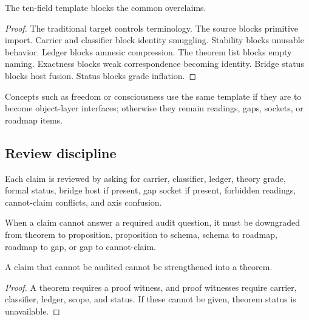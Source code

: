 \begin{theorem}
\label{thm:philosophy-template-prevents-overclaiming}
The ten-field template blocks the common overclaims.
\end{theorem}
\begin{proof}
The traditional target controls terminology. The source blocks
primitive import. Carrier and classifier block identity smuggling.
Stability blocks unusable behavior. Ledger blocks amnesic compression.
The theorem list blocks empty naming. Exactness blocks weak
correspondence becoming identity. Bridge status blocks host fusion.
Status blocks grade inflation.
\end{proof}

\begin{corollary}
\label{cor:philosophy-objects-use-template}
Concepts such as freedom or consciousness use the same template if
they are to become object-layer interfaces; otherwise they remain
readings, gaps, sockets, or roadmap items.
\end{corollary}

\subsection{Review discipline}
\label{subsec:philosophy-review-discipline}

\begin{definition}
\label{def:philosophy-review-questions}
Each claim is reviewed by asking for carrier, classifier, ledger,
theory grade, formal status, bridge host if present, gap socket if
present, forbidden readings, cannot-claim conflicts, and axis
confusion.
\end{definition}

\begin{definition}
\label{def:philosophy-automatic-downgrade}
When a claim cannot answer a required audit question, it must be
downgraded from theorem to proposition, proposition to schema, schema
to roadmap, roadmap to gap, or gap to cannot-claim.
\end{definition}

\begin{theorem}
\label{thm:philosophy-unauditable-claims-not-strengthened}
A claim that cannot be audited cannot be strengthened into a theorem.
\end{theorem}
\begin{proof}
A theorem requires a proof witness, and proof witnesses require
carrier, classifier, ledger, scope, and status. If these cannot be
given, theorem status is unavailable.
\end{proof}

